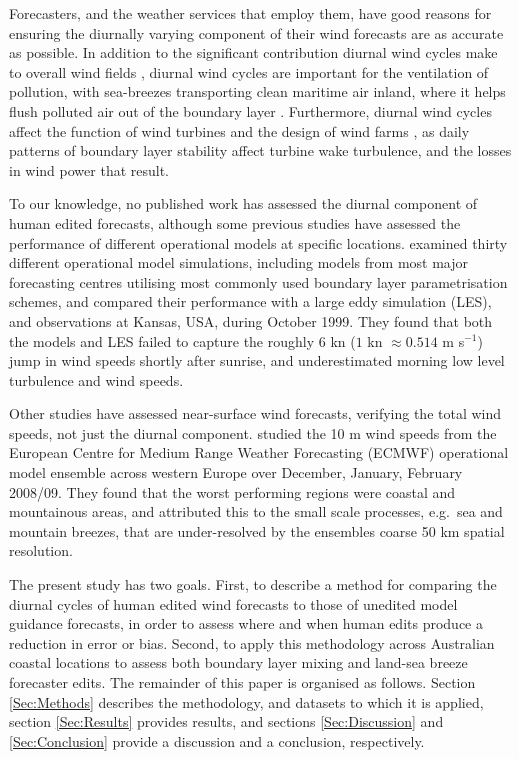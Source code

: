 \documentclass[twocol]{ametsoc}
\begin{document}
Forecasters, and the weather services that employ them, have good reasons for ensuring the diurnally varying component of their wind forecasts are as accurate as possible. In addition to the significant contribution diurnal wind cycles make to overall wind fields \citep[e.g.][]{dai99}, diurnal wind cycles are important for the ventilation of pollution, with sea-breezes transporting clean maritime air inland, where it helps flush polluted air out of the boundary layer \citep{miller03, physick92}. Furthermore, diurnal wind cycles affect the function of wind turbines \citep{englberger18} and the design of wind farms \citep{abkar16}, as daily patterns of boundary layer stability affect turbine wake turbulence, and the losses in wind power that result.

To our knowledge, no published work has assessed the diurnal component of human edited forecasts, although some previous studies have assessed the performance of different operational models at specific locations. \citet{svensson11} examined thirty different operational model simulations, including models from most major forecasting centres utilising most commonly used boundary layer parametrisation schemes, and compared their performance with a large eddy simulation (LES), and observations at Kansas, USA, during October 1999. They found that both the models and LES failed to capture the roughly $6$ kn ($1$ kn $\approx 0.514$ m s$^{-1}$) jump in wind speeds shortly after sunrise, and underestimated morning low level turbulence and wind speeds.

Other studies have assessed near-surface wind forecasts, verifying the total wind speeds, not just the diurnal component. \citet{pinson12} studied the 10 m wind speeds from the European Centre for Medium Range Weather Forecasting (ECMWF) operational model ensemble across western Europe over December, January, February 2008/09. They found that the worst performing regions were coastal and mountainous areas, and attributed this to the small scale processes, e.g.~sea and mountain breezes, that are under-resolved by the ensembles coarse 50 km spatial resolution.

The present study has two goals. First, to describe a method for comparing the diurnal cycles of human edited wind forecasts to those of unedited model guidance forecasts, in order to assess where and when human edits produce a reduction in error or bias. Second, to apply this methodology across Australian coastal locations to assess both boundary layer mixing and land-sea breeze forecaster edits. The remainder of this paper is organised as follows. Section \ref{Sec:Methods} describes the methodology, and datasets to which it is applied, section \ref{Sec:Results} provides results, and sections \ref{Sec:Discussion} and \ref{Sec:Conclusion} provide a discussion and a conclusion, respectively.
\end{document}
